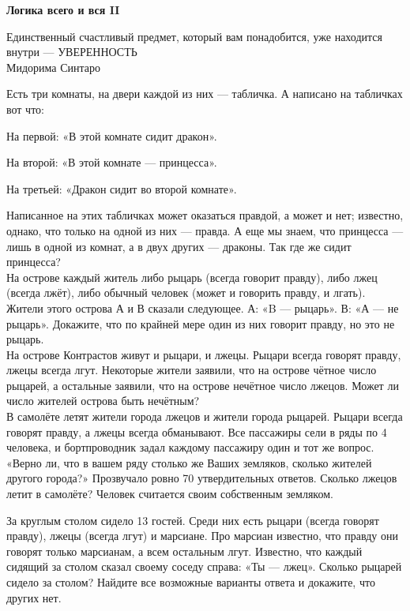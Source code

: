 \centerline{\bf \Huge Логика всего и вся II}

\begin{flushright}
        \scriptsize{Единственный счастливый предмет, который вам понадобится, уже находится внутри — УВЕРЕННОСТЬ\\ Мидорима Синтаро}
\end{flushright}



Есть три комнаты, на двери каждой из них — табличка. А написано на табличках вот что:

На первой: «В этой комнате сидит дракон».

На второй: «В этой комнате — принцесса».

На третьей: «Дракон сидит во второй комнате».

Написанное на этих табличках может оказаться правдой, а может и нет; известно, однако, что только на одной из них — правда. А еще мы знаем, что принцесса — лишь в одной из комнат, а в двух других — драконы. Так где же сидит принцесса?\\


 На острове каждый житель либо рыцарь (всегда говорит правду), либо
лжец (всегда лжёт), либо обычный человек (может и говорить правду, и лгать). Жители этого
острова А и В сказали следующее. А: «B — рыцарь». В: «А — не рыцарь». Докажите, что по
крайней мере один из них говорит правду, но это не рыцарь.\\



 На острове Контрастов живут и рыцари, и лжецы.
Рыцари всегда говорят правду, лжецы всегда лгут. Некоторые жители заявили, что на острове
чётное число рыцарей, а остальные заявили, что на острове нечётное число лжецов. Может ли
число жителей острова быть нечётным?\\


  В самолёте летят жители города лжецов и жители города рыцарей. Рыцари всегда говорят правду, а лжецы всегда обманывают. Все пассажиры сели
в ряды по 4 человека, и бортпроводник задал каждому пассажиру один и тот же вопрос. «Верно
ли, что в вашем ряду столько же Ваших земляков, сколько жителей другого города?» Прозвучало ровно 70 утвердительных ответов. Сколько лжецов летит в самолёте? Человек считается
своим собственным земляком.\\

\newpage


 За круглым столом сидело 13 гостей. Среди них есть рыцари
(всегда говорят правду), лжецы (всегда лгут) и марсиане. Про марсиан известно, что правду они
говорят только марсианам, а всем остальным лгут. Известно, что каждый сидящий за столом
сказал своему соседу справа: «Ты — лжец». Сколько рыцарей сидело за столом? Найдите все
возможные варианты ответа и докажите, что других нет.\\




